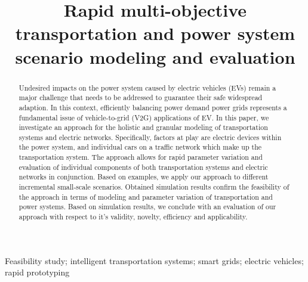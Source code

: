 \title{Rapid multi-objective transportation and power system scenario modeling and evaluation}

\author{
	\and
}

\maketitle

\begin{abstract}
Undesired impacts on the power system caused by electric vehicles (EVs) remain a major challenge that needs to be addressed to guarantee their safe widespread adaption. In this context, efficiently balancing power demand power grids represents a fundamental issue of vehicle-to-grid (V2G) applications of EV. In this paper, we investigate an approach for the holistic and granular modeling of transportation systems and electric networks. Specifically, factors at play are electric devices within the power system, and individual cars on a traffic network which make up the transportation system. The approach allows for rapid parameter variation and evaluation of individual components of both transportation systems and electric networks in conjunction. Based on examples, we apply our approach to different incremental small-scale scenarios. Obtained simulation results confirm the feasibility of the approach in terms of modeling and parameter variation of transportation and power systems. Based on simulation results, we conclude with an evaluation of our approach with respect to it's validity, novelty, efficiency and applicability.
\end{abstract}

\begin{keywords}
Feasibility study; intelligent transportation systems; smart grids; electric vehicles;  rapid prototyping
\end{keywords}